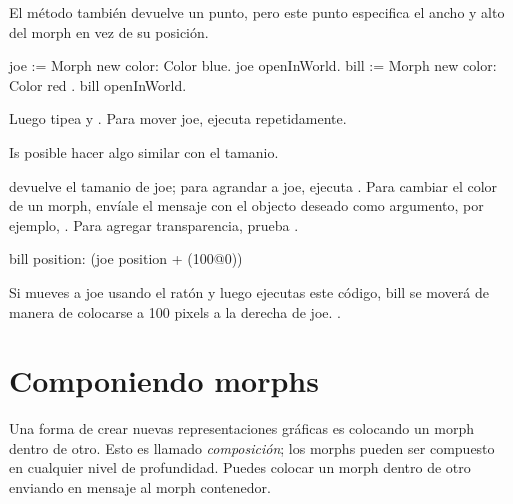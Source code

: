 \documentclass[a4paper,10pt,twoside]{book}
\begin{document}
El m\'etodo  tambi\'en devuelve un punto, pero este punto especifica el ancho y alto del morph en vez de su posici\'on.


\begin{code}{}
joe := Morph new color: Color blue.
joe openInWorld.
bill := Morph new color: Color red .
bill openInWorld.
\end{code}
\noindent
Luego tipea  y .
Para mover joe, ejecuta  repetidamente.

Is posible hacer algo similar con el tamanio.

  devuelve el tamanio de joe; para agrandar a joe, ejecuta .
Para cambiar el color de un morph, env\'iale el mensaje  con el objecto  deseado como argumento, por ejemplo, .
Para agregar transparencia, prueba .

\begin{code}{}
bill position: (joe position + (100@0))
\end{code}
\noindent
Si mueves a joe usando el rat\'on y luego ejecutas este c\'odigo, bill se mover\'a de manera de colocarse a 100 pixels a la derecha de joe.
.

\section{Componiendo morphs}

Una forma de crear nuevas representaciones gr\'aficas es colocando un morph dentro de otro.
Esto es llamado \emph{composici\'on}; los morphs pueden ser compuesto en cualquier nivel de profundidad.
%
Puedes colocar un morph dentro de otro enviando en mensaje  al morph contenedor.
\end{document}
